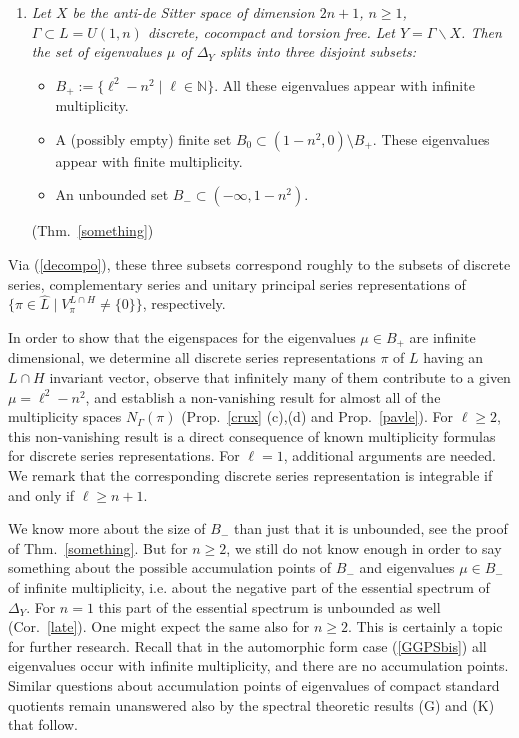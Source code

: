 \documentclass[10]{amsart}
\theoremstyle{remark}
\theoremstyle{definition}
\numberwithin{equation}{section}
\newcommand{\N}{\mathbb{N}}           %
\begin{document}
\begin{enumerate}
\item[({\bf F})] {\em Let $X$ be the anti-de Sitter space of dimension $2n+1$, $n\ge1$, $\Gamma\subset L=U(1,n)$ discrete, cocompact and torsion free. Let $Y=\Gamma\backslash X$.
Then the set of eigenvalues $\mu$ of $\Delta_Y$ splits into three disjoint subsets:
\begin{itemize}
\item $B_+:=\{\ell^2-n^2\mid\ell\in\N\}$. All these eigenvalues appear with infinite multiplicity.
\item A (possibly empty) finite set $B_0\subset (1-n^2,0)\setminus B_+$. These eigenvalues appear with finite multiplicity. 
\item An unbounded set $B_-\subset (-\infty,1-n^2)$.
\end{itemize}
}
(Thm.~\ref{something})
\end{enumerate}
Via (\ref{decompo}), these three subsets correspond roughly to the subsets of discrete series, complementary series and unitary principal series representations of  $\{\pi\in\widehat L\mid V_\pi^{L\cap H}\ne\{0\}\}$, respectively. 

In order to show that the eigenspaces for the eigenvalues $\mu\in B_+$ are infinite dimensional, we determine all discrete series
representations $\pi$ of $L$ having an $L\cap H$ invariant vector, observe that infinitely many of them contribute to a given $\mu=\ell^2-n^2$, and establish a non-vanishing result
for almost all of the multiplicity spaces $N_\Gamma(\pi)$ (Prop.~\ref{crux} (c),(d) and Prop.~\ref{pavle}). For $\ell\ge 2$, this non-vanishing result is a direct consequence of known multiplicity formulas for discrete series representations. For $\ell=1$, additional arguments are needed. We remark that the corresponding discrete series representation is integrable if and only if $\ell\ge n+1$. 

We know more about the size of $B_-$ than just that it is unbounded, see 
the proof of Thm.~\ref{something}.
But for $n\ge 2$, we still do not know enough in order
to say something about the possible accumulation points of $B_-$ and eigenvalues $\mu\in B_-$ of infinite multiplicity, i.e. about the negative part of the essential spectrum of $\Delta_Y$.
For $n=1$ this part of the essential spectrum is unbounded as well (Cor.~\ref{late}). One might expect the same also for $n\ge 2$. This is certainly a topic for further research. Recall that in the automorphic form case (\ref{GGPSbis}) all eigenvalues occur with infinite multiplicity, and there are no accumulation points.
Similar questions about accumulation points of eigenvalues of compact standard quotients  remain unanswered also by the spectral theoretic results  ({G}) and ({K}) that follow.
\end{document}
